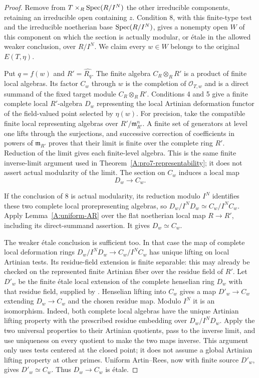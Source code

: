 \begin{proof}
Remove from $T\times_R\operatorname{Spec}(R/I^N)$ the other irreducible
components, retaining an irreducible open containing $z$.
Condition 8, with this finite-type test and the irreducible
noetherian base $\operatorname{Spec}(R/I^N)$, gives a nonempty open $W$ of
this component on which the section is actually modular, or
\'etale in the allowed weaker conclusion, over $R/I^N$.
We claim every $w\in W$ belongs to the original $E(T,\eta)$.

Put $q=f(w)$ and $R'=\widehat{R_q}$.  The finite algebra
$C_R\otimes_RR'$ is a product of finite local algebras.  Its
factor $C_w$ through $w$ is the completion of
$\mathcal O_{T,w}$ and is a direct summand of the fixed target
module $C_R\otimes_RR'$.
Conditions 4 and 5 give a finite complete local $R'$-algebra
$D_w$ representing the local Artinian deformation functor of
the field-valued point selected by $\eta(w)$.
For precision, take the compatible finite local representing
algebras over $R'/\mathfrak m_{R'}^n$.  A finite set of
generators at level one lifts through the surjections, and
successive correction of coefficients in powers of
$\mathfrak m_{R'}$ proves that their limit is finite over
the complete ring $R'$.  Reduction of the limit gives each
finite-level algebra.  This is the same finite inverse-limit
argument used in Theorem~\ref{A:pro7-representability}; it
does not assert actual modularity of the limit.
The section on $C_w$ induces a local map
\[
                         D_w\longrightarrow C_w.
\]

If the conclusion of 8 is actual modularity, its reduction
modulo $I^N$ identifies these two complete local prorepresenting
algebras, so
$D_w/I^ND_w\simeq C_w/I^NC_w$.
Apply Lemma~\ref{A:uniform-AR} over the flat noetherian local
map $R\to R'$, including its direct-summand assertion.
It gives $D_w\simeq C_w$.

The weaker \'etale conclusion is sufficient too.  In that
case the map of complete local deformation rings
$D_w/I^ND_w\to C_w/I^NC_w$ has unique lifting on local
Artinian tests.  Its residue-field extension is finite separable:
this may already be checked on the represented finite Artinian
fiber over the residue field of $R'$.
Let $D'_w$ be the
finite \'etale local extension of the complete henselian ring
$D_w$ with that residue field, supplied by
\cite[Lemma 10.153.7]{StacksFiniteEtaleHenselL1}.
Henselian lifting into $C_w$
gives a map $D'_w\to C_w$ extending $D_w\to C_w$ and the
chosen residue map.  Modulo $I^N$ it is an isomorphism.  Indeed,
both complete local algebras have the unique Artinian lifting
property with the prescribed residue embedding over
$D_w/I^ND_w$.  Apply the two universal properties to their
Artinian quotients, pass to the inverse limit, and use uniqueness
on every quotient to make the two maps inverse.  This argument
only uses tests centered at the closed point; it does not
assume a global Artinian lifting property at other primes.
Uniform Artin--Rees, now with finite source $D'_w$, gives
$D'_w\simeq C_w$.  Thus $D_w\to C_w$ is \'etale.


\end{proof}
